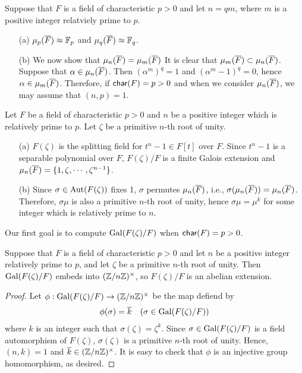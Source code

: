 \begin{obs}
    Suppose that $F$ is a field of characteristic $p>0$ and let $n=qm$, where $m$ is a positive integer relatviely prime to $p$.
    \begin{enumerate}
        \item[(a)]
        {
            $\mu_p(\overline{F})\approx{\mathbb{F}}_p$ and $\mu_q(\overline{F})\approx{\mathbb{F}}_q$.
        }
        \item[(b)]
        {
            We now show that $\mu_n(\overline{F})=\mu_m(\overline{F})$
            It is clear that $\mu_m(\overline{F})\subset\mu_n(\overline{F})$.
            Suppose that $\alpha\in\mu_n(\overline{F})$.
            Then $(\alpha^m)^q=1$ and $(\alpha^m-1)^q=0$, hence $\alpha\in\mu_m(\overline{F})$.
            Therefore, if ${\textsf{char}({F})}=p>0$ and when we consider $\mu_n(\overline{F})$, we may assume that $(n, p)=1$.
        }
    \end{enumerate}
\end{obs}
\begin{obs}
    Let $F$ be a field of characteristic $p>0$ and $n$ be a positive integer which is relatively prime to $p$.
    Let $\zeta$ be a primitive $n$-th root of unity.
    \begin{enumerate}
        \item[(a)]
        {
            $F(\zeta)$ is the splitting field for $t^n-1\in F[t]$ over $F$.
            Since $t^n-1$ is a separable polynomial over $F$, $F(\zeta)/F$ is a finite Galois extension and $\mu_n(\overline{F})=\{1, \zeta, \cdots, \zeta^{n-1}\}$.
        }
        \item[(b)]
        {
            Since $\sigma\in{\textrm{Aut}({F(\zeta)})}$ fixes 1, $\sigma$ permutes $\mu_n(\overline{F})$, i.e., $\sigma(\mu_n(\overline{F}))=\mu_n(\overline{F})$.
            Therefore, $\sigma\mu$ is also a primitive $n$-th root of unity, hence $\sigma\mu=\mu^k$ for some integer which is relatively prime to $n$.
        }
    \end{enumerate}
\end{obs}
Our first goal is to compute ${\textrm{Gal}({F(\zeta)/F})}$ when ${\textsf{char}({F})}=p>0$.
\begin{thm}
    Suppose that $F$ is a field of characteristic $p>0$ and let $n$ be a positive integer relatively prime to $p$, and let $\zeta$ be a primitive $n$-th root of unity.
    Then ${\textrm{Gal}({F(\zeta)/F})}$ embeds into $({\mathbb{Z}}/n{\mathbb{Z}})^\times$, so $F(\zeta)/F$ is an abelian extension.
\end{thm}
\begin{proof}
    Let $\phi: {\textrm{Gal}({F(\zeta)/F})}\rightarrow ({\mathbb{Z}}/n{\mathbb{Z}})^\times$ be the map defiend by
    \begin{align*}
        \phi(\sigma)=\overline{k}\quad(\sigma\in{\textrm{Gal}({F(\zeta)/F})})
    \end{align*}
    where $k$ is an integer such that $\sigma(\zeta)=\zeta^k$.
    Since $\sigma\in{\textrm{Gal}({F(\zeta)/F})}$ is a field automorphism of $F(\zeta)$, $\sigma(\zeta)$ is a primitive $n$-th root of unity.
    Hence, $(n, k)=1$ and $\overline{k}\in({\mathbb{Z}}/n{\mathbb{Z}})^\times$.
    It is easy to check that $\phi$ is an injective group homomorphism, as desired.
\end{proof}
